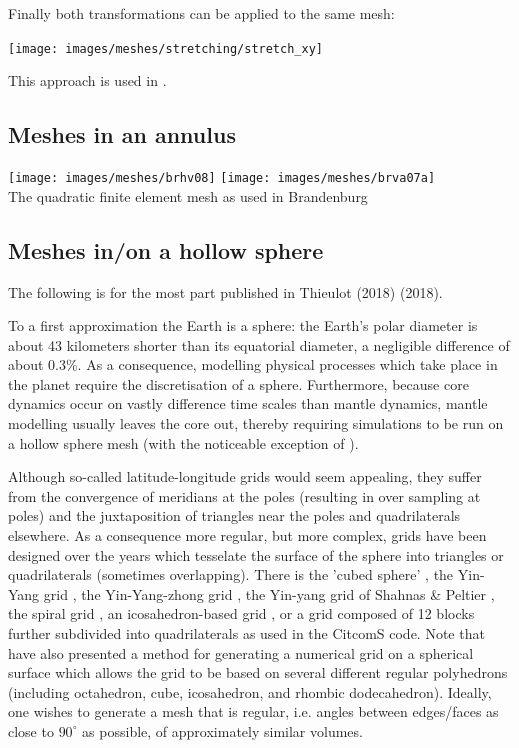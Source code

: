 Finally both transformations can be applied to the same mesh:
\begin{center}
\texttt{[image: images/meshes/stretching/stretch\_xy]}
\end{center}

This approach is used in .

\subsection{Meshes in an annulus}


\begin{center}
\texttt{[image: images/meshes/brhv08]}
\texttt{[image: images/meshes/brva07a]}\\
{\captionfont The quadratic finite element mesh as used in 
Brandenburg \etal \cite{brhv08,brva07a}}
\end{center}


\subsection{Meshes in/on a hollow sphere}

The following is for the most part published in Thieulot (2018) \textcite{thie18} (2018).

To a first approximation the Earth is a sphere: the Earth's polar diameter is 
about 43 kilometers shorter than its equatorial diameter, a negligible difference of 
about 0.3\%. As a consequence, modelling physical processes 
which take place in the planet require the discretisation of a sphere. 
Furthermore, because core dynamics occur on vastly difference time scales than mantle dynamics, mantle 
modelling usually leaves the core out, thereby requiring simulations to be run on a hollow sphere mesh
(with the noticeable exception of \textcite{geyu07}).

Although so-called latitude-longitude grids would seem appealing, 
they suffer from the convergence of meridians at the poles
(resulting in over sampling at poles) and the juxtaposition of triangles 
near the poles and quadrilaterals elsewhere. 
As a consequence more regular, but more complex, grids have been designed 
over the years which tesselate the surface of the 
sphere into triangles or quadrilaterals (sometimes overlapping).
There is the 'cubed sphere' \cite{roip96,heta03,chob05,sthh06,chcc07,brmw10,yiym19},
the Yin-Yang grid \cite{kasa04,yoka04,yoka06,kaks08,tack08,crta14,crta16},
the Yin-Yang-zhong grid \cite{haka16}, the Yin-yang grid of 
Shahnas \& Peltier \cite{shpe15}, the spiral grid \cite{hust08}, 
an icosahedron-based grid \cite{bafr85,malp02},
or a grid composed of 12 blocks further subdivided into quadrilaterals \cite{zhzm00} 
as used in the CitcomS code.
Note that \cite{oldp12} have also presented a method for generating a numerical 
grid on a spherical surface which 
allows the grid to be based on several different regular polyhedrons (including octahedron, 
cube, icosahedron, and rhombic dodecahedron). 
Ideally, one wishes to generate a mesh that is regular,
i.e. angles between edges/faces as close to $90^\circ$ as possible, 
of approximately similar volumes.


